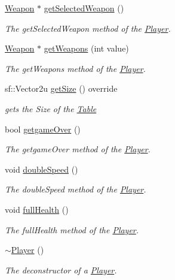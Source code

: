 \begin{DoxyCompactItemize}
\hyperlink{class_weapon}{Weapon} $\ast$ \hyperlink{class_player_ab087a0124f92c63e91cc846db9b82b76}{get\+Selected\+Weapon} ()
\begin{DoxyCompactList}\small\item\em The get\+Selected\+Weapon method of the \hyperlink{class_player}{Player}. \end{DoxyCompactList}\item 
\hyperlink{class_weapon}{Weapon} $\ast$ \hyperlink{class_player_af442b7ed41244bba619d1a2ef8812123}{get\+Weapons} (int value)
\begin{DoxyCompactList}\small\item\em The get\+Weapons method of the \hyperlink{class_player}{Player}. \end{DoxyCompactList}\item 
sf\+::\+Vector2u \hyperlink{class_player_a9b815bbbc9cb8332549acc10d03c7c0b}{get\+Size} () override
\begin{DoxyCompactList}\small\item\em gets the Size of the \hyperlink{class_table}{Table} \end{DoxyCompactList}\item 
bool \hyperlink{class_player_a1d3d8988bfe2487e1ef7d82502171c8e}{getgame\+Over} ()
\begin{DoxyCompactList}\small\item\em The getgame\+Over method of the \hyperlink{class_player}{Player}. \end{DoxyCompactList}\item 
void \hyperlink{class_player_a8e4910c81921d28b35878db4395b1f47}{double\+Speed} ()
\begin{DoxyCompactList}\small\item\em The double\+Speed method of the \hyperlink{class_player}{Player}. \end{DoxyCompactList}\item 
void \hyperlink{class_player_a807069673b66d211110c018998456d3e}{full\+Health} ()
\begin{DoxyCompactList}\small\item\em The full\+Health method of the \hyperlink{class_player}{Player}. \end{DoxyCompactList}\item 
\hypertarget{class_player_a749d2c00e1fe0f5c2746f7505a58c062}{\hyperlink{class_player_a749d2c00e1fe0f5c2746f7505a58c062}{$\sim$\+Player} ()}\label{class_player_a749d2c00e1fe0f5c2746f7505a58c062}

\begin{DoxyCompactList}\small\item\em The deconstructor of a \hyperlink{class_player}{Player}. \end{DoxyCompactList}\end{DoxyCompactItemize}
